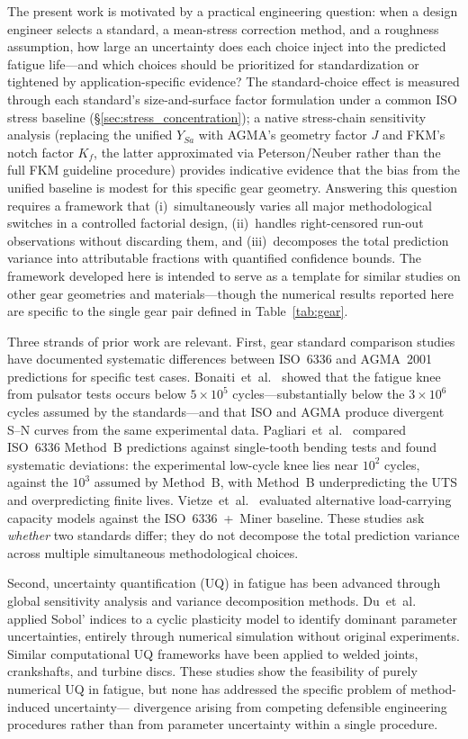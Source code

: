 \documentclass[twocolumn,12pt,a4paper]{article}
\begin{document}
The present work is motivated by a practical engineering question:
when a design engineer selects a standard, a mean-stress correction
method, and a roughness assumption, how large an uncertainty does each
choice inject into the predicted fatigue life---and which choices
should be prioritized for standardization or tightened by
application-specific evidence? The standard-choice effect is measured
through each standard's size-and-surface factor formulation under a
common ISO stress baseline (\S\ref{sec:stress_concentration}); a
native stress-chain sensitivity analysis (replacing the unified
$Y_{Sa}$ with AGMA's geometry factor $J$ and FKM's notch factor
$K_f$, the latter approximated via Peterson/Neuber rather than the
full FKM guideline procedure) provides indicative evidence that the
bias from the unified baseline is modest for this specific gear
geometry. Answering this question
requires a framework that (i)~simultaneously varies all major
methodological switches in a controlled factorial design,
(ii)~handles right-censored
run-out observations without discarding them, and (iii)~decomposes the
total prediction variance into attributable fractions with quantified
confidence bounds. The framework developed here is intended to serve as
a template for similar studies on other gear geometries and
materials---though the numerical results reported here are specific
to the single gear pair defined in Table~\ref{tab:gear}.

Three strands of prior work are relevant. First, gear standard
comparison studies have documented systematic differences between
ISO~6336 and AGMA~2001 predictions for specific test cases.
Bonaiti~et~al.~\cite{bonaiti2024} showed that the fatigue knee from
pulsator tests occurs below $5\times10^5$ cycles---substantially
below the $3\times10^6$ cycles assumed by the
standards---and that ISO and AGMA produce divergent S--N curves from
the same experimental data. Pagliari~et~al.~\cite{pagliari2025}
compared ISO~6336 Method~B predictions against single-tooth bending
tests and found systematic deviations: the experimental low-cycle knee
lies near $10^2$ cycles, against the $10^3$ assumed by Method~B, with
Method~B underpredicting the UTS and overpredicting finite lives.
Vietze~et~al.~\cite{vietze2024}
evaluated alternative load-carrying capacity models against the
ISO~6336~+~Miner baseline. These studies ask \emph{whether} two
standards differ; they do not decompose the total prediction variance
across multiple simultaneous methodological choices.

Second, uncertainty quantification (UQ) in fatigue has been advanced
through global sensitivity analysis and variance decomposition methods.
Du~et~al.~\cite{du2022} applied Sobol' indices to a cyclic plasticity
model to identify dominant parameter
uncertainties, entirely through numerical simulation without original
experiments. Similar computational UQ frameworks have been applied to
welded joints, crankshafts, and turbine discs. These studies
show the feasibility of purely numerical UQ in fatigue, but none
has addressed the specific problem of method-induced uncertainty---%
divergence arising from competing defensible engineering procedures
rather than from parameter uncertainty within a single procedure.
\end{document}
